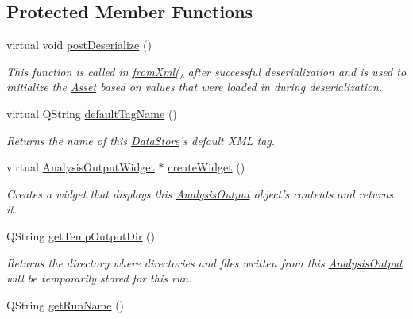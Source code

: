 \subsection*{Protected Member Functions}
\begin{DoxyCompactItemize}
\item 
virtual void \hyperlink{class_picto_1_1_analysis_output_a2a9b708fdcd043db3239c267a8fa3418}{post\-Deserialize} ()
\begin{DoxyCompactList}\small\item\em This function is called in \hyperlink{class_picto_1_1_asset_a8bed4da09ecb1c07ce0dab313a9aba67}{from\-Xml()} after successful deserialization and is used to initialize the \hyperlink{class_picto_1_1_asset}{Asset} based on values that were loaded in during deserialization. \end{DoxyCompactList}\item 
virtual Q\-String \hyperlink{class_picto_1_1_analysis_output_a4fa6c835effb707ea2d163ef17d6cc5a}{default\-Tag\-Name} ()
\begin{DoxyCompactList}\small\item\em Returns the name of this \hyperlink{class_picto_1_1_data_store}{Data\-Store}'s default X\-M\-L tag. \end{DoxyCompactList}\item 
virtual \hyperlink{class_picto_1_1_analysis_output_widget}{Analysis\-Output\-Widget} $\ast$ \hyperlink{class_picto_1_1_analysis_output_ab3e5bc668e8b25860fecdabe877dc1b9}{create\-Widget} ()
\begin{DoxyCompactList}\small\item\em Creates a widget that displays this \hyperlink{class_picto_1_1_analysis_output}{Analysis\-Output} object's contents and returns it. \end{DoxyCompactList}\item 
Q\-String \hyperlink{class_picto_1_1_analysis_output_af8505f0a11febca2b21d003f02bf4f5d}{get\-Temp\-Output\-Dir} ()
\begin{DoxyCompactList}\small\item\em Returns the directory where directories and files written from this \hyperlink{class_picto_1_1_analysis_output}{Analysis\-Output} will be temporarily stored for this run. \end{DoxyCompactList}\item 
\hypertarget{class_picto_1_1_analysis_output_a142e7f2f9d64cc67e2e9d004cef7a4c2}{Q\-String \hyperlink{class_picto_1_1_analysis_output_a142e7f2f9d64cc67e2e9d004cef7a4c2}{get\-Run\-Name} ()}\label{class_picto_1_1_analysis_output_a142e7f2f9d64cc67e2e9d004cef7a4c2}


\end{DoxyCompactItemize}
